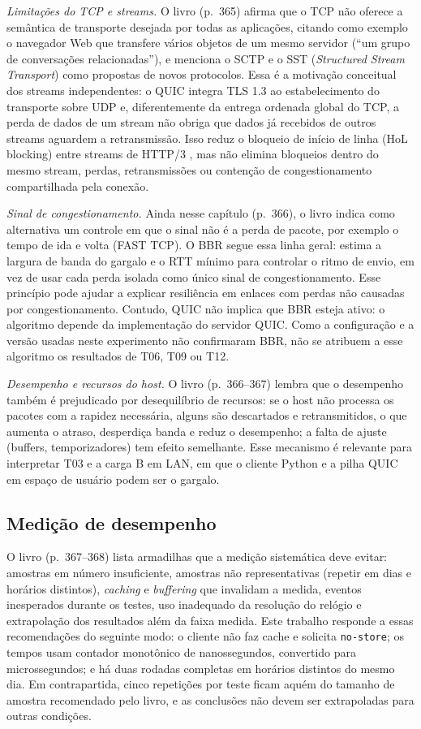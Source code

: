 \documentclass[12pt,a4paper]{article}
\begin{document}
\emph{Limitações do TCP e streams.} O livro (p.~365) afirma que o TCP não oferece a
semântica de transporte desejada por todas as aplicações, citando como exemplo o navegador Web
que transfere vários objetos de um mesmo servidor (``um grupo de conversações relacionadas''),
e menciona o SCTP e o SST (\emph{Structured Stream Transport}) como propostas de novos
protocolos. Essa é a motivação conceitual dos streams independentes: o QUIC \cite{rfc9000}
integra TLS 1.3 \cite{rfc9001} ao estabelecimento do transporte sobre UDP e, diferentemente da
entrega ordenada global do TCP, a perda de dados de um stream não obriga que dados já recebidos
de outros streams aguardem a retransmissão. Isso reduz o bloqueio de início de linha (HoL
blocking) entre streams de HTTP/3 \cite{rfc9114}, mas não elimina bloqueios dentro do mesmo
stream, perdas, retransmissões ou contenção de congestionamento compartilhada pela conexão.

\emph{Sinal de congestionamento.} Ainda nesse capítulo (p.~366), o livro indica como alternativa
um controle em que o sinal não é a perda de pacote, por exemplo o tempo de ida e volta (FAST
TCP). O BBR \cite{bbr2016} segue essa linha geral: estima a largura de banda do gargalo e o
RTT mínimo para controlar o ritmo de envio, em vez de usar cada perda isolada como único
sinal de congestionamento. Esse princípio pode ajudar a explicar resiliência em enlaces com
perdas não causadas por congestionamento. Contudo, QUIC não implica que BBR esteja ativo: o
algoritmo depende da implementação do servidor QUIC. Como a configuração e a versão usadas
neste experimento não confirmaram BBR, não se atribuem a esse algoritmo os resultados de T06,
T09 ou T12.

\emph{Desempenho e recursos do host.} O livro (p.~366--367) lembra que o desempenho também é
prejudicado por desequilíbrio de recursos: se o host não processa os pacotes com a rapidez
necessária, alguns são descartados e retransmitidos, o que aumenta o atraso, desperdiça banda
e reduz o desempenho; a falta de ajuste (buffers, temporizadores) tem efeito semelhante. Esse
mecanismo é relevante para interpretar T03 e a carga B em LAN, em que o cliente Python e a
pilha QUIC em espaço de usuário podem ser o gargalo.

\subsection{Medição de desempenho}

O livro (p.~367--368) lista armadilhas que a medição sistemática deve evitar: amostras em
número insuficiente, amostras não representativas (repetir em dias e horários distintos),
\emph{caching} e \emph{buffering} que invalidam a medida, eventos inesperados durante os
testes, uso inadequado da resolução do relógio e extrapolação dos resultados além da faixa
medida. Este trabalho responde a essas recomendações do seguinte modo: o cliente não faz
cache e solicita \texttt{no-store}; os tempos usam contador monotônico de nanossegundos,
convertido para microssegundos; e há duas rodadas completas em horários distintos do mesmo
dia. Em contrapartida, cinco repetições por teste ficam aquém do tamanho de amostra
recomendado pelo livro, e as conclusões não devem ser extrapoladas para outras condições.
\end{document}
